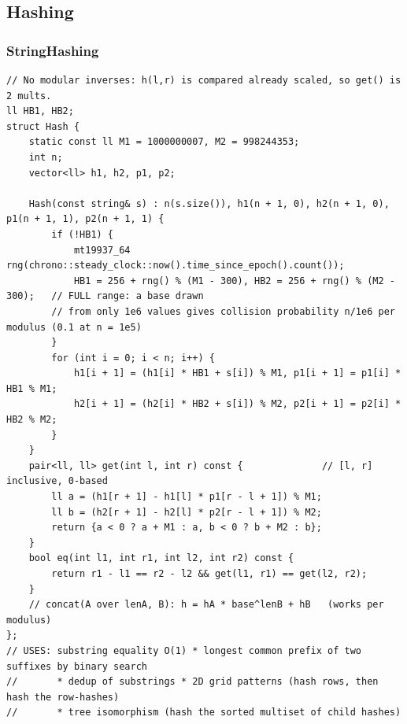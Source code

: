 \documentclass[9pt,a4paper,twocolumn]{extarticle}
\begin{document}
\subsection{Hashing}

\filbreak
\subsubsection{StringHashing}
\nopagebreak
\begin{lstlisting}
// No modular inverses: h(l,r) is compared already scaled, so get() is 2 mults.
ll HB1, HB2;
struct Hash {
    static const ll M1 = 1000000007, M2 = 998244353;
    int n;
    vector<ll> h1, h2, p1, p2;

    Hash(const string& s) : n(s.size()), h1(n + 1, 0), h2(n + 1, 0), p1(n + 1, 1), p2(n + 1, 1) {
        if (!HB1) {
            mt19937_64 rng(chrono::steady_clock::now().time_since_epoch().count());
            HB1 = 256 + rng() % (M1 - 300), HB2 = 256 + rng() % (M2 - 300);   // FULL range: a base drawn
        // from only 1e6 values gives collision probability n/1e6 per modulus (0.1 at n = 1e5)
        }
        for (int i = 0; i < n; i++) {
            h1[i + 1] = (h1[i] * HB1 + s[i]) % M1, p1[i + 1] = p1[i] * HB1 % M1;
            h2[i + 1] = (h2[i] * HB2 + s[i]) % M2, p2[i + 1] = p2[i] * HB2 % M2;
        }
    }
    pair<ll, ll> get(int l, int r) const {              // [l, r] inclusive, 0-based
        ll a = (h1[r + 1] - h1[l] * p1[r - l + 1]) % M1;
        ll b = (h2[r + 1] - h2[l] * p2[r - l + 1]) % M2;
        return {a < 0 ? a + M1 : a, b < 0 ? b + M2 : b};
    }
    bool eq(int l1, int r1, int l2, int r2) const {
        return r1 - l1 == r2 - l2 && get(l1, r1) == get(l2, r2);
    }
    // concat(A over lenA, B): h = hA * base^lenB + hB   (works per modulus)
};
// USES: substring equality O(1) * longest common prefix of two suffixes by binary search
//       * dedup of substrings * 2D grid patterns (hash rows, then hash the row-hashes)
//       * tree isomorphism (hash the sorted multiset of child hashes)
\end{lstlisting}

\filbreak
\end{document}
